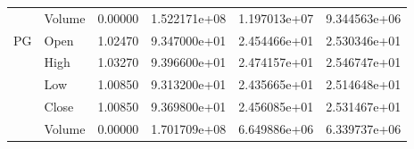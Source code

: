 \begin{table}
\begin{tabular}{llrrrr}
   & Volume &  0.00000 &  1.522171e+08 &  1.197013e+07 &  9.344563e+06 \\
\cline{1-6}
\multirow{5}{*}{PG} & Open &  1.02470 &  9.347000e+01 &  2.454466e+01 &  2.530346e+01 \\
   & High &  1.03270 &  9.396600e+01 &  2.474157e+01 &  2.546747e+01 \\
   & Low &  1.00850 &  9.313200e+01 &  2.435665e+01 &  2.514648e+01 \\
   & Close &  1.00850 &  9.369800e+01 &  2.456085e+01 &  2.531467e+01 \\
   & Volume &  0.00000 &  1.701709e+08 &  6.649886e+06 &  6.339737e+06 \\
\bottomrule
\end{tabular}
\end{table}
